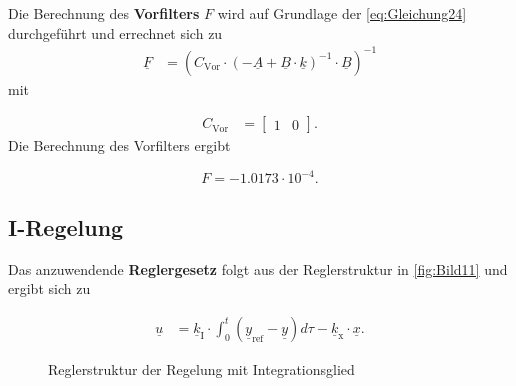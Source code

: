 Die Berechnung des \textbf{Vorfilters} $F$ wird auf Grundlage der \autoref{eq:Gleichung24} durchgeführt und errechnet sich zu
\begin{align}
    \underline{F} &= \left(C_{\mathrm{Vor}}\cdot\left(-\underline{A}+\underline{B}\cdot\underline{k}\right)^{-1}\cdot\underline{B}\right)^{-1}
    \label{eq:Gleichung24}
\end{align}
\newline
mit

\begin{align*}
    C_{\mathrm{Vor}} &= 
    \begin{bmatrix}
        1 & 0
    \end{bmatrix}.
\end{align*}
\newline
Die Berechnung des Vorfilters ergibt

\begin{equation}
    \boxed{F = -1.0173\cdot 10^{-4}}.
\end{equation}

\subsection{I-Regelung} \label{sec:Iregler}

Das anzuwendende \textbf{Reglergesetz} folgt aus der Reglerstruktur in \autoref{fig:Bild11} und ergibt sich zu

\begin{align}
    \underline{u} &= \underline{k}_{\mathrm{I}}\cdot\int_{0}^t(\underline{y}_{\mathrm{ref}}-\underline{y})d\tau-\underline{k}_{\mathrm{x}}\cdot\underline{x}.
    \label{eq:Gleichung25}
\end{align}

\begin{figure}[H]
   \centering
   \caption[Reglerstruktur der I-Regelung]{Reglerstruktur der Regelung mit Integrationsglied}
   \label{fig:Bild11}
\end{figure}

